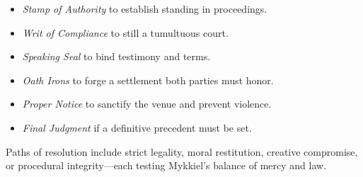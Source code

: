 \begin{itemize}
  \item \emph{Stamp of Authority} to establish standing in proceedings.
  \item \emph{Writ of Compliance} to still a tumultuous court.
  \item \emph{Speaking Seal} to bind testimony and terms.
  \item \emph{Oath Irons} to forge a settlement both parties must honor.
  \item \emph{Proper Notice} to sanctify the venue and prevent violence.
  \item \emph{Final Judgment} if a definitive precedent must be set.
\end{itemize}

\noindent Paths of resolution include strict legality, moral restitution, creative compromise, or procedural integrity—each testing Mykkiel’s balance of mercy and law.
